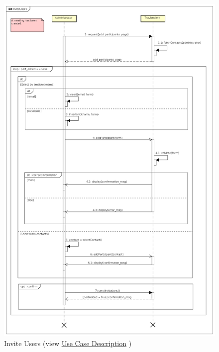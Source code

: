\begin{figure}[h]
\centering\includegraphics[height=.98\textheight]{Images/SequenceDiagrams/Admin/InviteUsers.png}{}
\caption[Invite Users]{{Invite Users}\label{SeqDiagr:InviteUsers} (view \hyperref[UseCaseDescr:InviteUsers]{Use Case Description} )}
\end{figure}

